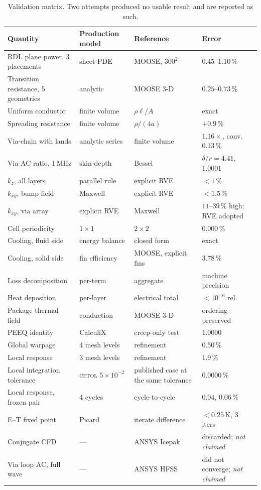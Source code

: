 \documentclass[journal]{IEEEtran}
\begin{document}
\begin{table}[!t]
\caption{Validation matrix. Two attempts produced no usable result and are reported as such.}
\label{tab:valid}
\centering
\footnotesize
\setlength{\tabcolsep}{3.5pt}
\begin{tabular}{@{}L{2.30cm}L{1.50cm}L{1.45cm}L{2.05cm}@{}}
\toprule
Quantity & Production model & Reference & Error \\
\midrule
RDL plane power, 3 placements & sheet PDE & MOOSE, $300^{2}$ & $0.45$--$1.10$\,\% \\
Transition resistance, 5 geometries & analytic & MOOSE 3-D & $0.25$--$0.73$\,\% \\
Uniform conductor & finite volume & $\rho\ell/A$ & exact \\
Spreading resistance & finite volume & $\rho/(4a)$ & $+0.9$\,\% \\
Via-chain with lands & analytic series & finite volume & $1.16\times$, conv. $0.13$\,\% \\
Via AC ratio, 1\,MHz & skin-depth & Bessel & $\delta/r{=}4.41$, $1.0001$ \\
$k_{z}$, all layers & parallel rule & explicit RVE & $<1$\,\% \\
$k_{xy}$, bump field & Maxwell & explicit RVE & $<1.5$\,\% \\
$k_{xy}$, via array & explicit RVE & Maxwell & $11$--$39$\,\% high; RVE adopted \\
Cell periodicity & $1{\times}1$ & $2{\times}2$ & $0.000$\,\% \\
Cooling, fluid side & energy balance & closed form & exact \\
Cooling, solid side & fin efficiency & MOOSE, explicit fins & $3.78$\,\% \\
Loss decomposition & per-term & aggregate & machine precision \\
Heat deposition & per-layer & electrical total & $<10^{-6}$ rel. \\
Package thermal field & conduction & MOOSE 3-D & ordering preserved \\
PEEQ identity & CalculiX & creep-only test & $1.0000$ \\
Global warpage & 4 mesh levels & refinement & $0.50$\,\% \\
Local response & 3 mesh levels & refinement & $1.9$\,\% \\
Local integration tolerance & \textsc{cetol} $5{\times}10^{-2}$ & published case at the same tolerance & $0.0000$\,\% \\
Local response, frozen pair & 4 cycles & cycle-to-cycle & $0.04$, $0.06$\,\% \\
E--T fixed point & Picard & iterate difference & $<0.25$\,K, 3 iters \\
\midrule
Conjugate CFD & --- & ANSYS Icepak & discarded; \emph{not claimed} \\
Via loop AC, full wave & --- & ANSYS HFSS & did not converge; \emph{not claimed} \\
\bottomrule
\end{tabular}
\end{table}
\end{document}

